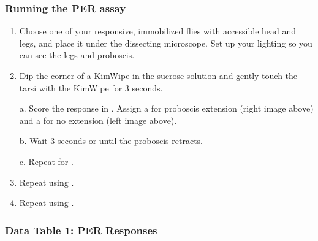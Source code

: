 \documentclass[letterpaper,10pt,english]{jupyterBook}
\begin{document}
\subsubsection{Running the PER assay}
\label{\detokenize{Drosophila/Day1:running-the-per-assay}}\begin{enumerate}
%
\setcounter{enumi}{8}
\item {} 
\sphinxAtStartPar
Choose one of your responsive, immobilized flies with accessible head and legs, and place it under the dissecting microscope. Set up your lighting so you can see the legs and proboscis.

\item {} 
\sphinxAtStartPar
Dip the corner of a KimWipe in the sucrose solution and gently touch the tarsi with the KimWipe for 3 seconds.

\sphinxAtStartPar
{}

\sphinxAtStartPar
a. Score the response in . Assign a  for proboscis extension (right image above) and a  for no extension (left image above).

\sphinxAtStartPar
b. Wait 3 seconds or until the proboscis retracts.

\sphinxAtStartPar
c. Repeat for .

\item {} 
\sphinxAtStartPar
Repeat using .

\item {} 
\sphinxAtStartPar
Repeat using .

\end{enumerate}


\subsubsection{Data Table 1: PER Responses}
\label{\detokenize{Drosophila/Day1:data-table-1-per-responses}}
\end{document}
